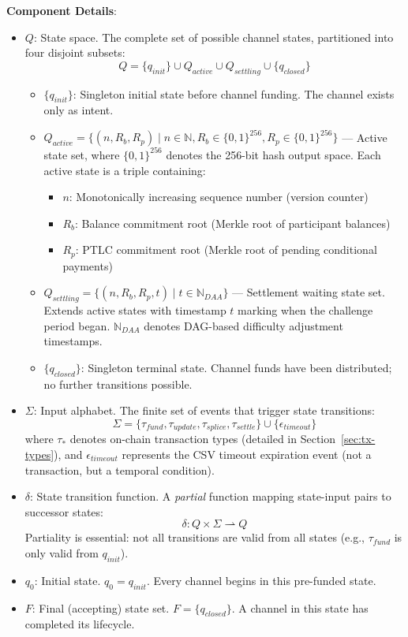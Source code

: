 \textbf{Component Details}:
\begin{itemize}
    \item \textbf{$Q$}: State space. The complete set of possible channel states, partitioned into four disjoint subsets:
    $$Q = \{q_{init}\} \cup Q_{active} \cup Q_{settling} \cup \{q_{closed}\}$$
    
    \begin{itemize}
        \item $\{q_{init}\}$: Singleton initial state before channel funding. The channel exists only as intent.
        \item $Q_{active} = \{(n, R_b, R_p) \mid n \in \mathbb{N}, R_b \in \{0,1\}^{256}, R_p \in \{0,1\}^{256}\}$ --- Active state set, where $\{0,1\}^{256}$ denotes the 256-bit hash output space. Each active state is a triple containing:
        \begin{itemize}
            \item $n$: Monotonically increasing sequence number (version counter)
            \item $R_b$: Balance commitment root (Merkle root of participant balances)
            \item $R_p$: PTLC commitment root (Merkle root of pending conditional payments)
        \end{itemize}
        \item $Q_{settling} = \{(n, R_b, R_p, t) \mid t \in \mathbb{N}_{DAA}\}$ --- Settlement waiting state set. Extends active states with timestamp $t$ marking when the challenge period began. $\mathbb{N}_{DAA}$ denotes DAG-based difficulty adjustment timestamps.
        \item $\{q_{closed}\}$: Singleton terminal state. Channel funds have been distributed; no further transitions possible.
    \end{itemize}
    
    \item \textbf{$\Sigma$}: Input alphabet. The finite set of events that trigger state transitions:
    $$\Sigma = \{\tau_{fund}, \tau_{update}, \tau_{splice}, \tau_{settle}\} \cup \{\epsilon_{timeout}\}$$
    where $\tau_*$ denotes on-chain transaction types (detailed in Section~\ref{sec:tx-types}), and $\epsilon_{timeout}$ represents the CSV timeout expiration event (not a transaction, but a temporal condition).
    
    \item \textbf{$\delta$}: State transition function. A \textit{partial} function mapping state-input pairs to successor states:
    $$\delta: Q \times \Sigma \rightharpoonup Q$$
    Partiality is essential: not all transitions are valid from all states (e.g., $\tau_{fund}$ is only valid from $q_{init}$).
    
    \item \textbf{$q_0$}: Initial state. $q_0 = q_{init}$. Every channel begins in this pre-funded state.
    
    \item \textbf{$F$}: Final (accepting) state set. $F = \{q_{closed}\}$. A channel in this state has completed its lifecycle.
\end{itemize}

